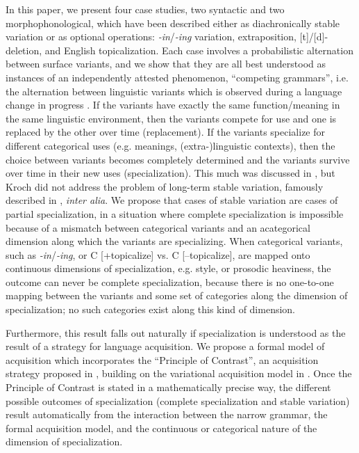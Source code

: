 \documentclass[a4paper,aps,prl,12pt,tightenlines,superscriptaddress]{revtex4}
\begin{document}
In this paper, we present four case studies, two syntactic and two morphophonological, which have been described either as diachronically stable variation or as optional operations: \textsl{-in}/\textsl{-ing} variation, extraposition, [t]/[d]-deletion, and English topicalization.
Each case involves a probabilistic alternation between surface variants, and we show that they are all best understood as instances of an independently attested phenomenon, ``competing grammars'', i.e. the alternation between linguistic variants which is observed during a language change in progress \citep[][]{kroch1989}.
If the variants have exactly the same function/meaning in the same linguistic environment, then the variants compete for use and one is replaced by the other over time (replacement). 
If the variants specialize for different categorical uses (e.g. meanings, (extra-)linguistic  contexts), then the choice between variants becomes completely determined and the variants survive over time in their new uses (specialization). 
This much was discussed in \citet{kroch1994}, but Kroch did not address the problem of long-term stable variation, famously described in \citet{labov1989}, \textsl{inter alia}. 
We propose that cases of stable variation are cases of partial specialization, in a situation where complete specialization is impossible because of a mismatch between categorical variants and an acategorical dimension along which the variants are specializing.
When categorical variants, such as \textsl{-in}/\textsl{-ing}, or C [+topicalize] vs. C [--topicalize], are mapped onto continuous dimensions of specialization, e.g. style, or prosodic heaviness, the outcome can never be complete specialization, because there is no one-to-one mapping between the variants and some set of categories along the dimension of specialization; no such categories exist along this kind of dimension.
 
Furthermore, this result falls out naturally if specialization is understood as the result of a strategy for language acquisition. 
We propose a formal model of acquisition which incorporates the ``Principle of Contrast'', an acquisition strategy proposed in \citet{clark1987, clark1990}, building on the variational acquisition model in \citet{yang2000}.
Once the Principle of Contrast is stated in a mathematically precise way, the different possible outcomes of specialization (complete specialization and stable variation) result automatically from the interaction between the narrow grammar, the formal acquisition model, and the continuous or categorical nature of the dimension of specialization.



\end{document}
